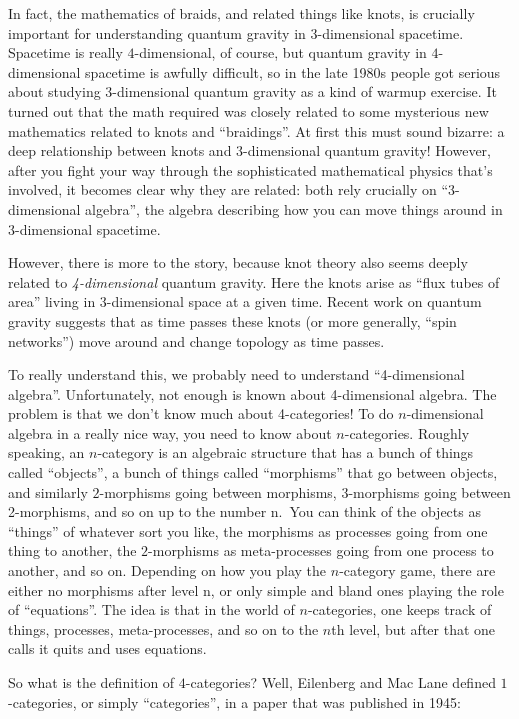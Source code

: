 \documentclass{article}
\begin{document}
In fact, the mathematics of braids, and related things like knots, is
crucially important for understanding quantum gravity in
\(3\)-dimensional spacetime. Spacetime is really \(4\)-dimensional, of
course, but quantum gravity in \(4\)-dimensional spacetime is awfully
difficult, so in the late 1980s people got serious about studying
\(3\)-dimensional quantum gravity as a kind of warmup exercise. It
turned out that the math required was closely related to some mysterious
new mathematics related to knots and ``braidings''. At first this must
sound bizarre: a deep relationship between knots and \(3\)-dimensional
quantum gravity! However, after you fight your way through the
sophisticated mathematical physics that's involved, it becomes clear why
they are related: both rely crucially on ``3-dimensional algebra'', the
algebra describing how you can move things around in \(3\)-dimensional
spacetime.

However, there is more to the story, because knot theory also seems
deeply related to \emph{4-dimensional} quantum gravity. Here the knots
arise as ``flux tubes of area'' living in \(3\)-dimensional space at a
given time. Recent work on quantum gravity suggests that as time passes
these knots (or more generally, ``spin networks'') move around and
change topology as time passes.

To really understand this, we probably need to understand
``4-dimensional algebra''. Unfortunately, not enough is known about
4-dimensional algebra. The problem is that we don't know much about
4-categories! To do \(n\)-dimensional algebra in a really nice way, you
need to know about \(n\)-categories. Roughly speaking, an \(n\)-category
is an algebraic structure that has a bunch of things called ``objects'',
a bunch of things called ``morphisms'' that go between objects, and
similarly \(2\)-morphisms going between morphisms, \(3\)-morphisms going
between 2-morphisms, and so on up to the number n.~You can think of the
objects as ``things'' of whatever sort you like, the morphisms as
processes going from one thing to another, the \(2\)-morphisms as
meta-processes going from one process to another, and so on. Depending
on how you play the \(n\)-category game, there are either no morphisms
after level n, or only simple and bland ones playing the role of
``equations''. The idea is that in the world of \(n\)-categories, one
keeps track of things, processes, meta-processes, and so on to the
\(n\)th level, but after that one calls it quits and uses equations.

So what is the definition of \(4\)-categories? Well, Eilenberg and Mac
Lane defined \(1\)-categories, or simply ``categories'', in a paper that
was published in 1945:
\end{document}
